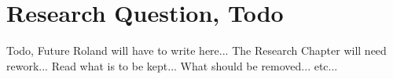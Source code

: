 
\section{Research Question, Todo}

Todo, Future Roland will have to write here...
The Research Chapter will need rework...
Read what is to be kept...
What should be removed...
etc...
